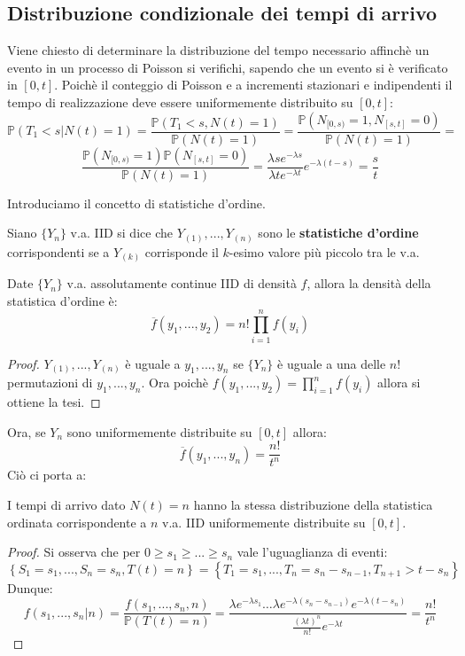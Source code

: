 \subsection{Distribuzione condizionale dei tempi di arrivo}

Viene chiesto di determinare la distribuzione del tempo necessario affinchè un evento in un processo di Poisson si verifichi, sapendo che un evento si è verificato in $[0,t]$. Poichè il conteggio di Poisson e a incrementi stazionari e indipendenti il tempo di realizzazione deve essere uniformemente distribuito su $[0,t]$:
\[\mathbb{P}(T_1<s|N(t)=1)=\frac{\mathbb{P}(T_1<s,N(t)=1)}{\mathbb{P}(N(t)=1)}=\frac{\mathbb{P}(N_{[0,s)}=1,N_{[s,t]}=0)}{\mathbb{P}(N(t)=1)}=\]
\[\frac{\mathbb{P}(N_{[0,s)}=1)\mathbb{P}(N_{[s,t]}=0)}{\mathbb{P}(N(t)=1)}=\frac{\lambda se^{-\lambda s}}{\lambda te^{-\lambda t}}e^{-\lambda(t-s)}=\frac{s}{t}\]

Introduciamo il concetto di statistiche d'ordine.
\begin{definition}
Siano $\{Y_n\}$ v.a. IID si dice che $Y_{(1)},...,Y_{(n)}$ sono le \textbf{statistiche d'ordine} corrispondenti se a $Y_{(k)}$ corrisponde il $k$-esimo valore più piccolo tra le v.a.
\end{definition}

\begin{proposition}
Date $\{Y_n\}$ v.a.  assolutamente continue IID di densità $f$, allora la densità della statistica d'ordine è:
\[\overline{f}(y_1,...,y_2)=n!\prod_{i=1}^nf(y_i)\]
\begin{proof}
$Y_{(1)},...,Y_{(n)}$ è uguale a $y_{1},...,y_{n}$ se $\{Y_n\}$ è uguale a una delle $n!$ permutazioni di $y_{1},...,y_{n}$. Ora poichè $f(y_1,...,y_2)=\prod_{i=1}^nf(y_i)$ allora si ottiene la tesi.
\end{proof}
\end{proposition}

Ora, se $Y_n$ sono uniformemente distribuite su $[0,t]$ allora: \[\overline{f}(y_1,...,y_n)=\frac{n!}{t^n}\]
Ciò ci porta a:
\begin{theorem}
I tempi di arrivo dato $N(t)=n$ hanno la stessa distribuzione della statistica ordinata corrispondente a $n$ v.a. IID uniformemente distribuite su $[0,t]$.
\begin{proof}
Si osserva che per $0\geq s_1\geq...\geq s_n$ vale l'uguaglianza di eventi:
\[\left\{S_1=s_1,...,S_n=s_n,T(t)=n\right\}=\left\{T_1=s_1,...,T_n=s_n-s_{n-1},T_{n+1}>t-s_n\right\}\]
Dunque:
\[f(s_1,...,s_n|n)=\frac{f(s_1,...,s_n,n)}{\mathbb{P}(T(t)=n)}=\frac{\lambda e^{-\lambda s_1}\dots\lambda e^{-\lambda (s_n-s_{n-1})}e^{-\lambda (t-s_n)}}{\frac{\left(\lambda t\right)^n}{n!}e^{-\lambda t}}=\frac{n!}{t^n}\]
\end{proof}
\end{theorem}

